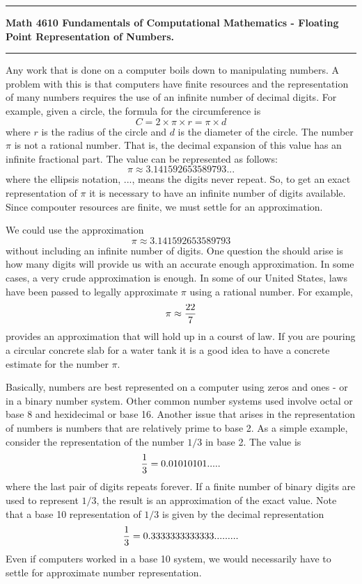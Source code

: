 \documentclass[10pt,fleqn]{article}
\begin{document}
\vskip0.1in\hrule\vskip0.1in
\noindent
{\bf Math 4610 Fundamentals of Computational Mathematics  -  Floating Point 
    Representation of Numbers.}  
\vskip0.1in\hrule\vskip0.1in
\noindent
Any work that is done on a computer boils down to manipulating numbers. A
problem with this is that computers have finite resources and the representation
of many numbers requires the use of an infinite number of decimal digits. For
example, given a circle, the formula for the circumference is
$$C = 2 \times \pi \times r = \pi \times d$$
where $r$ is the radius of the circle and $d$ is the diameter of the circle. The
number $\pi$ is not a rational number. That is, the decimal expansion of this
value has an infinite fractional part. The value can be represented as follows:
$$\pi\approx 3.141592653589793...$$
where the ellipsis notation, $...$, means the digits never repeat. So, to get an
exact representation of $\pi$ it is necessary to have an infinite number of
digits available. Since compouter resources are finite, we must settle for an
approximation.

We could use the approximation
$$\pi\approx 3.141592653589793$$
without including an infinite number of digits. One question the should arise is
how many digits will provide us with an accurate enough approximation.  In some
cases, a very crude approximation is enough. In some of our United States, laws
have been passed to legally approximate $\pi$ using a rational number. For
example,
$$\pi\approx {{22}\over 7}$$
provides an approximation that will hold up in a courst of law. If you are
pouring a circular concrete slab for a water tank it is a good idea to have a
concrete estimate for the number $\pi$.

Basically, numbers are best represented on a computer using zeros and ones -
or in a binary number system. Other common number systems used involve octal
or base 8 and hexidecimal or base 16. Another issue that arises in the
representation of numbers is numbers that are relatively prime to base 2. As
a simple example, consider the representation of the number $1/3$ in base 2.
The value is
$${1\over 3} = 0.01010101.....$$
where the last pair of digits repeats forever. If a finite number of binary
digits are used to represent $1/3$, the result is an approximation of the exact
value. Note that a base 10 representation of $1/3$ is given by the decimal
representation
$${1\over 3} = 0.3333333333333.........$$
Even if computers worked in a base 10 system, we would necessarily have to
settle for approximate number representation.
\end{document}
